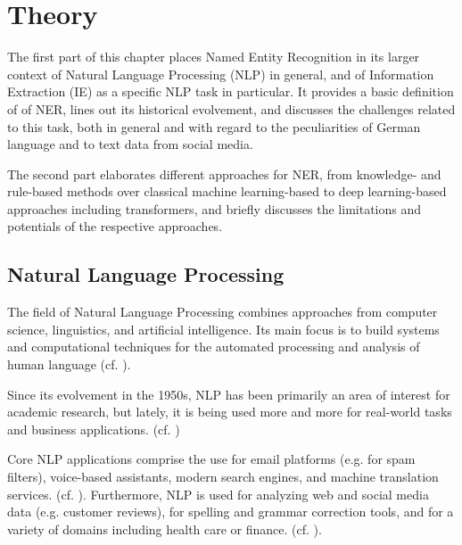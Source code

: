 \chapter{Theory}
\label{cha:theory}

The first part of this chapter places Named Entity Recognition in its larger context of Natural Language Processing (NLP) in general, and of Information Extraction (IE) as a specific NLP task in particular. It provides a basic definition of of NER, lines out its historical evolvement, and discusses the challenges related to this task, both in general and with regard to the peculiarities of German language and to text data from social media. 

The second part elaborates different approaches for NER, from knowledge- and rule-based methods over classical machine learning-based to deep learning-based approaches including transformers, and briefly discusses the limitations and potentials of the respective approaches. %


\section{Natural Language Processing}

The field of Natural Language Processing combines approaches from computer science, linguistics, and artificial intelligence. Its main focus is to build systems and computational techniques for the automated processing and analysis of human language (cf. \cite[xvii]{vajjala_practical_2020}).

Since its evolvement in the 1950s, NLP has been primarily an area of interest for academic research, but lately, it is being used more and more for real-world tasks and business applications. (cf. \cite[xvii]{vajjala_practical_2020})

Core NLP applications comprise the use for email platforms (e.g. for spam filters), voice-based assistants, modern search engines, and machine translation services. (cf. \cite[5]{vajjala_practical_2020}). Furthermore, NLP is used for analyzing web and social media data (e.g. customer reviews), for spelling and grammar correction tools, and for a variety of domains including health care or finance. (cf. \cite[5-6]{vajjala_practical_2020}).

